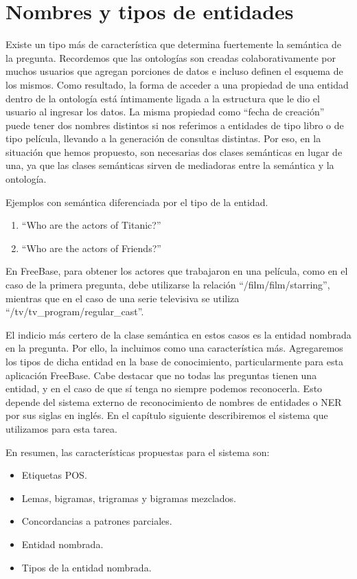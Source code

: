 
\section{Nombres y tipos de entidades}

Existe un tipo más de característica que determina fuertemente la semántica de la pregunta. Recordemos que las ontologías son creadas colaborativamente por muchos usuarios que agregan porciones de datos e incluso definen el esquema de los mismos. Como resultado, la forma de acceder a una propiedad de una entidad dentro de la ontología está íntimamente ligada a la estructura que le dio el usuario al ingresar los datos. La misma propiedad como ``fecha de creación'' puede tener dos nombres distintos si nos referimos a entidades de tipo libro o de tipo película, llevando a la generación de consultas distintas. Por eso, en la situación que hemos propuesto, son necesarias dos clases semánticas en lugar de una, ya que las clases semánticas sirven de mediadoras entre la semántica y la ontología.

\begin{example} Ejemplos con semántica diferenciada por el tipo de la entidad.
    \begin{enumerate}
        \item ``Who are the actors of Titanic?''
        \item ``Who are the actors of Friends?''
    \end{enumerate}
En FreeBase, para obtener los actores que trabajaron en una película, como en el caso de la primera pregunta, debe utilizarse la relación ``/film/film/starring'', mientras que en el caso de una serie televisiva se utiliza ``/tv/tv\_program/regular\_cast''.
\end{example}

El indicio más certero de la clase semántica en estos casos es la entidad nombrada en la pregunta. Por ello, la incluimos como una característica más. Agregaremos los tipos de dicha entidad en la base de conocimiento, particularmente para esta aplicación FreeBase. Cabe destacar que no todas las preguntas tienen una entidad, y en el caso de que sí tenga no siempre podemos reconocerla. Esto depende del sistema externo de reconocimiento de nombres de entidades o NER por sus siglas en inglés. En el capítulo siguiente describiremos el sistema que utilizamos para esta tarea.

En resumen, las características propuestas para el sistema son:
\begin{itemize}
    \item Etiquetas POS.
    \item Lemas, bigramas, trigramas y bigramas mezclados.
    \item Concordancias a patrones parciales.
    \item Entidad nombrada.
    \item Tipos de la entidad nombrada.
\end{itemize}


